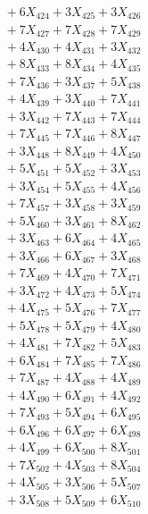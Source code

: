 \documentclass[a4paper,10pt]{article}
\begin{document}
{\begin{align}
&\;  + 6 X_{424} + 3 X_{425} + 3 X_{426} \\[0.3ex]
&\;  + 7 X_{427} + 7 X_{428} + 7 X_{429} \\[0.5ex]\allowbreak
&\;  + 4 X_{430} + 4 X_{431} + 3 X_{432} \\[0.3ex]
&\;  + 8 X_{433} + 8 X_{434} + 4 X_{435} \\[0.3ex]
&\;  + 7 X_{436} + 3 X_{437} + 5 X_{438} \\[0.3ex]
&\;  + 4 X_{439} + 3 X_{440} + 7 X_{441} \\[0.3ex]
&\;  + 3 X_{442} + 7 X_{443} + 7 X_{444} \\[0.3ex]
&\;  + 7 X_{445} + 7 X_{446} + 8 X_{447} \\[0.3ex]
&\;  + 3 X_{448} + 8 X_{449} + 4 X_{450} \\[0.3ex]
&\;  + 5 X_{451} + 5 X_{452} + 3 X_{453} \\[0.3ex]
&\;  + 3 X_{454} + 5 X_{455} + 4 X_{456} \\[0.3ex]
&\;  + 7 X_{457} + 3 X_{458} + 3 X_{459} \\[0.5ex]\allowbreak
&\;  + 5 X_{460} + 3 X_{461} + 8 X_{462} \\[0.3ex]
&\;  + 3 X_{463} + 6 X_{464} + 4 X_{465} \\[0.3ex]
&\;  + 3 X_{466} + 6 X_{467} + 3 X_{468} \\[0.3ex]
&\;  + 7 X_{469} + 4 X_{470} + 7 X_{471} \\[0.3ex]
&\;  + 3 X_{472} + 4 X_{473} + 5 X_{474} \\[0.3ex]
&\;  + 4 X_{475} + 5 X_{476} + 7 X_{477} \\[0.3ex]
&\;  + 5 X_{478} + 5 X_{479} + 4 X_{480} \\[0.3ex]
&\;  + 4 X_{481} + 7 X_{482} + 5 X_{483} \\[0.3ex]
&\;  + 6 X_{484} + 7 X_{485} + 7 X_{486} \\[0.3ex]
&\;  + 7 X_{487} + 4 X_{488} + 4 X_{489} \\[0.5ex]\allowbreak
&\;  + 4 X_{490} + 6 X_{491} + 4 X_{492} \\[0.3ex]
&\;  + 7 X_{493} + 5 X_{494} + 6 X_{495} \\[0.3ex]
&\;  + 6 X_{496} + 6 X_{497} + 6 X_{498} \\[0.3ex]
&\;  + 4 X_{499} + 6 X_{500} + 8 X_{501} \\[0.3ex]
&\;  + 7 X_{502} + 4 X_{503} + 8 X_{504} \\[0.3ex]
&\;  + 4 X_{505} + 3 X_{506} + 5 X_{507} \\[0.3ex]
&\;  + 3 X_{508} + 5 X_{509} + 6 X_{510} \\[0.3ex]

\end{align}}
\end{document}

